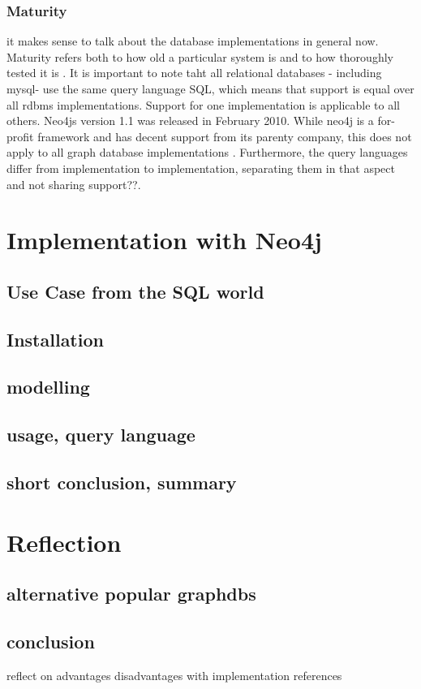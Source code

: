 \subsubsection{Maturity}
it makes sense to talk about the database implementations in general now. 
Maturity refers both to how old a particular system is and
to how thoroughly tested it is \cite{Vicknair2010}.
It is important to note taht all relational databases - including mysql- use the same query language SQL, which means that support is equal over all rdbms implementations. Support for one implementation is applicable to all others. \cite{GarimaAnalysis} 
Neo4js version 1.1 was released in February 2010. While neo4j is a for-profit framework and has decent support from its parenty company, this does not apply to all graph database implementations \cite{Vicknair2010}. Furthermore, the query languages differ from implementation to implementation, separating them in that aspect and not sharing support??.

\section{Implementation with Neo4j}
\subsection{Use Case from the SQL world}
\subsection{Installation}
\subsection{modelling}
\subsection{usage, query language}
\subsection{short conclusion, summary}

\section{Reflection}
\subsection{alternative popular graphdbs}
\subsection{conclusion}
reflect on advantages disadvantages with implementation references

